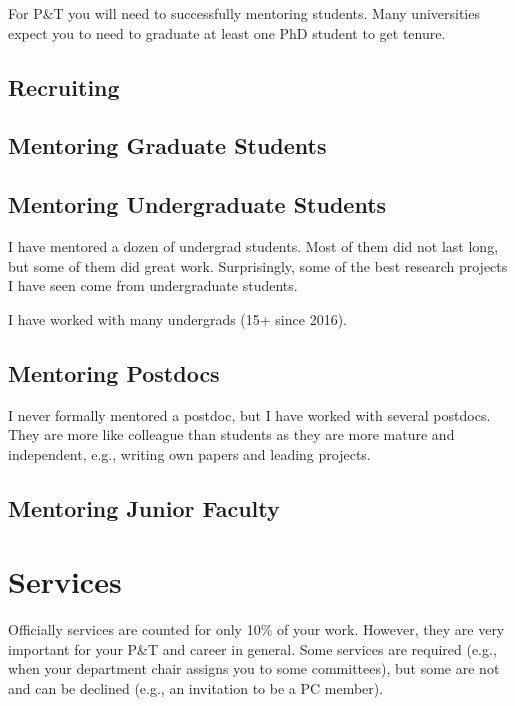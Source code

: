 \documentclass[oneside,11pt,dvipsnames]{book}
\begin{document}
For P\&T you will need to successfully mentoring students.  Many universities expect you to need to graduate at least one PhD student to get tenure.

\section{Recruiting}\label{sec:recruiting}


\section{Mentoring Graduate Students}


\section{Mentoring Undergraduate Students}
I have mentored a dozen of undergrad students. Most of them did not last long, but some of them did great work. 
Surprisingly, some of the best research projects I have seen come from undergraduate students.  


I have worked with many undergrads (15+ since 2016).


\section{Mentoring Postdocs}

I never formally mentored a postdoc, but I have worked with several postdocs. They are more like colleague than students as they are more mature and independent, e.g., writing own papers and leading projects.

\section{Mentoring Junior Faculty}

\chapter{Services}\label{sec:services}


Officially services are counted for only 10\% of your work. However, they are very important for your P\&T and career in general.
Some services are required (e.g., when your department chair assigns you to some committees), but some are not and can be declined (e.g., an invitation to be a PC member).  
\end{document}
